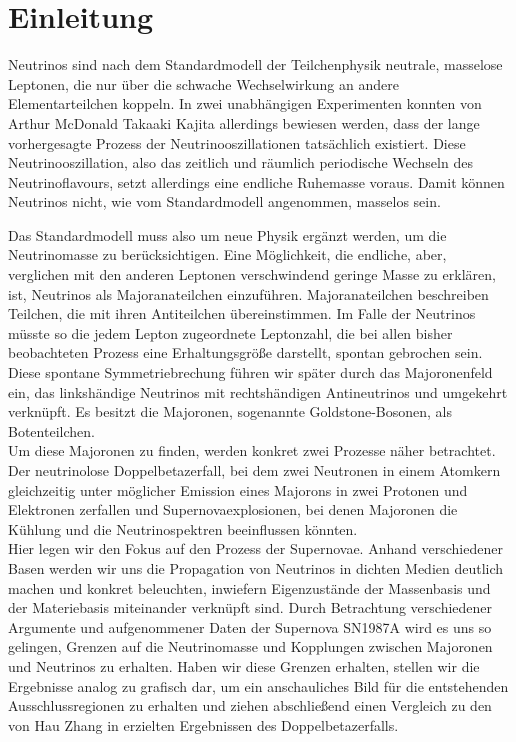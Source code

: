 \chapter{Einleitung}
\label{chap:einleitung}

Neutrinos sind nach dem Standardmodell der Teilchenphysik neutrale, masselose Leptonen, die nur über die schwache Wechselwirkung an andere Elementarteilchen koppeln.
In zwei unabhängigen Experimenten konnten von Arthur McDonald Takaaki Kajita allerdings bewiesen werden, dass der lange vorhergesagte Prozess der Neutrinooszillationen tatsächlich existiert.
Diese Neutrinooszillation, also das zeitlich und räumlich periodische Wechseln des Neutrinoflavours, setzt allerdings eine endliche Ruhemasse voraus.
Damit können Neutrinos nicht, wie vom Standardmodell angenommen, masselos sein.

Das Standardmodell muss also um neue Physik ergänzt werden, um die Neutrinomasse zu berücksichtigen.
Eine Möglichkeit, die endliche, aber, verglichen mit den anderen Leptonen verschwindend geringe Masse zu erklären, ist, Neutrinos als Majoranateilchen einzuführen.
Majoranateilchen beschreiben Teilchen, die mit ihren Antiteilchen übereinstimmen.
Im Falle der Neutrinos müsste so die jedem Lepton zugeordnete Leptonzahl, die bei allen bisher beobachteten Prozess eine Erhaltungsgröße darstellt, spontan gebrochen sein.
Diese spontane Symmetriebrechung führen wir später durch das Majoronenfeld ein, das linkshändige Neutrinos mit rechtshändigen Antineutrinos und umgekehrt verknüpft.
Es besitzt die Majoronen, sogenannte Goldstone-Bosonen, als Botenteilchen. \\
Um diese Majoronen zu finden, werden konkret zwei Prozesse näher betrachtet.
Der neutrinolose Doppelbetazerfall, bei dem zwei Neutronen in einem Atomkern gleichzeitig unter möglicher Emission eines Majorons in zwei Protonen und Elektronen zerfallen und Supernovaexplosionen, bei denen
Majoronen die Kühlung und die Neutrinospektren beeinflussen könnten. \\
Hier legen wir den Fokus auf den Prozess der Supernovae.
Anhand verschiedener Basen werden wir uns die Propagation von Neutrinos in dichten Medien deutlich machen und konkret beleuchten, 
inwiefern Eigenzustände der Massenbasis und der Materiebasis miteinander verknüpft sind.
Durch Betrachtung verschiedener Argumente und aufgenommener Daten der Supernova SN1987A wird es uns so gelingen, Grenzen auf die Neutrinomasse und Kopplungen zwischen Majoronen und Neutrinos zu erhalten.
Haben wir diese Grenzen erhalten, stellen wir die Ergebnisse analog zu \cite{päspaper} grafisch dar, um ein anschauliches Bild für die entstehenden Ausschlussregionen zu erhalten und ziehen abschließend einen Vergleich
zu den von Hau Zhang in \cite{hauhau} erzielten Ergebnissen des Doppelbetazerfalls.


